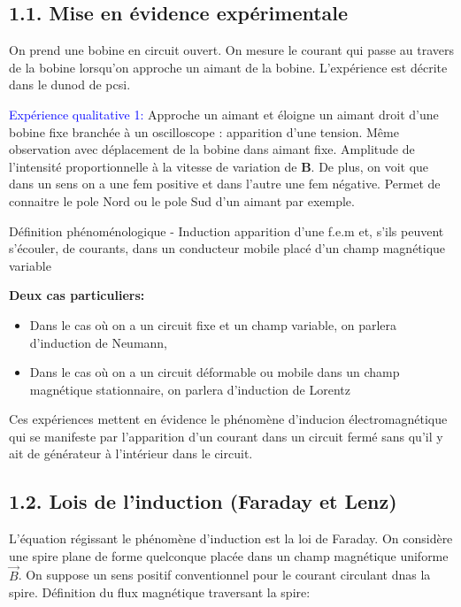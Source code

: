 \documentclass[french, a4paper, 10pt, twocolumn, landscape]{article}
\begin{document}
  \subsection*{1.1. Mise en évidence expérimentale}



 On prend une bobine en circuit ouvert. On mesure le courant qui passe au travers de la bobine lorsqu'on approche un aimant de la bobine.  L'expérience est décrite dans le dunod de pcsi.

  \textcolor{blue}{Expérience qualitative 1:} Approche un aimant et éloigne un aimant droit d'une bobine fixe branchée à un oscilloscope : apparition d'une tension. Même observation avec déplacement de la bobine dans aimant fixe. Amplitude de l'intensité proportionnelle à la vitesse de variation de $\mathbf B$. De plus, on voit que dans un sens on a une fem positive et dans l'autre une fem négative. Permet de connaitre le pole Nord ou le pole Sud d'un aimant par exemple.


  \begin{definition}{Définition phénoménologique - Induction}
    apparition d'une f.e.m et, s'ils peuvent s'écouler, de courants, dans un conducteur mobile placé d'un champ magnétique variable
  \end{definition}

  \textbf{Deux cas particuliers:} \begin{itemize}
    \item Dans le cas où on a un circuit fixe et un champ variable, on parlera d'induction de Neumann,
    \item Dans le cas où on a un circuit déformable ou mobile dans un champ magnétique stationnaire, on parlera d'induction de Lorentz
\end{itemize}

Ces expériences mettent en évidence le phénomène d'inducion électromagnétique qui se manifeste par l'apparition d'un courant dans un circuit fermé sans qu'il y ait de générateur à l'intérieur dans le circuit. 

\subsection*{1.2. Lois de l'induction (Faraday et Lenz)}

L'équation régissant le phénomène d'induction est la loi de Faraday. On considère une spire plane de forme quelconque placée dans un champ magnétique uniforme $\vec{B}$. On suppose un sens positif conventionnel pour le courant circulant dnas la spire. Définition du flux magnétique traversant la spire: 
\end{document}

